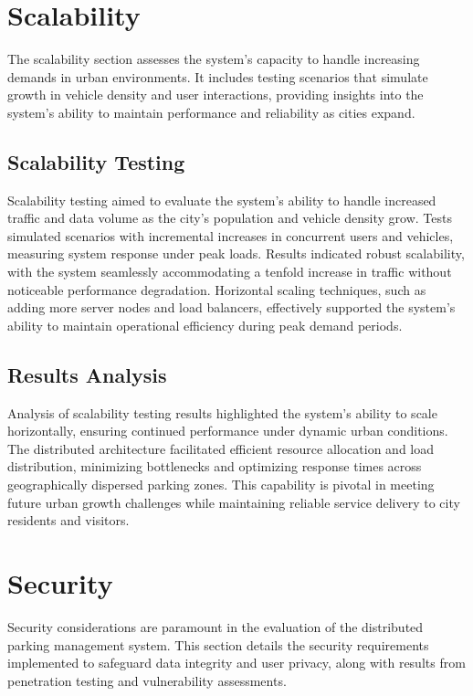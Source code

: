 \documentclass[oneside, 12pt, a4paper, draft]{book}
\begin{document}
\chapter{Scalability}
\label{sec:org9252f04}
The scalability section assesses the system's capacity to handle increasing demands in urban environments. It includes testing scenarios that simulate growth in vehicle density and user interactions, providing insights into the system's ability to maintain performance and reliability as cities expand.
\section{Scalability Testing}
\label{sec:orgd3f68f8}

Scalability testing aimed to evaluate the system's ability to handle increased traffic and data volume as the city's population and vehicle density grow. Tests simulated scenarios with incremental increases in concurrent users and vehicles, measuring system response under peak loads. Results indicated robust scalability, with the system seamlessly accommodating a tenfold increase in traffic without noticeable performance degradation. Horizontal scaling techniques, such as adding more server nodes and load balancers, effectively supported the system's ability to maintain operational efficiency during peak demand periods.
\section{Results Analysis}
\label{sec:orgc70074d}

Analysis of scalability testing results highlighted the system's ability to scale horizontally, ensuring continued performance under dynamic urban conditions. The distributed architecture facilitated efficient resource allocation and load distribution, minimizing bottlenecks and optimizing response times across geographically dispersed parking zones. This capability is pivotal in meeting future urban growth challenges while maintaining reliable service delivery to city residents and visitors.
\chapter{Security}
\label{sec:orgd9ae6f7}
Security considerations are paramount in the evaluation of the distributed parking management system. This section details the security requirements implemented to safeguard data integrity and user privacy, along with results from penetration testing and vulnerability assessments.
\end{document}
